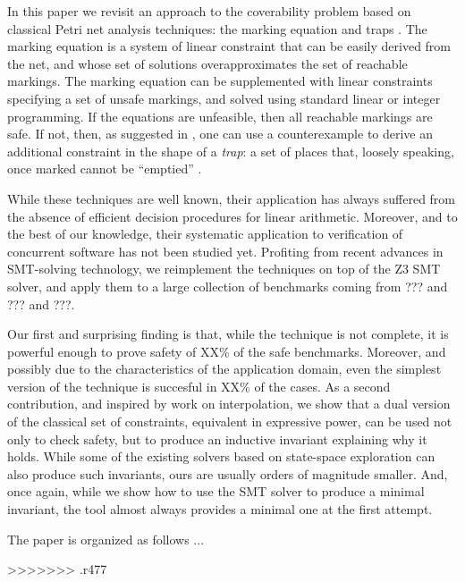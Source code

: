 In this paper we revisit an approach to the coverability problem 
based on classical Petri net analysis techniques: the marking equation
and traps \cite{murata,esparza_and_melzer}. The marking equation
is a system of linear constraint that can be easily derived from the net, and
whose set of solutions overapproximates the set of reachable markings. 
The marking equation can be supplemented with linear constraints specifying
a set of unsafe markings, and solved using standard linear or integer 
programming. If the equations are unfeasible, then all reachable markings
are safe. If not, then, as suggested in \cite{}, one can use a counterexample
to derive an additional constraint in the shape of a {\em trap}:  a set of
places that, loosely speaking, once marked cannot be ``emptied'' \cite{}.

While these techniques are well known, their application has always
suffered from the absence of efficient decision procedures for linear arithmetic.
Moreover, and to the best of our knowledge, their
systematic application to verification of concurrent software has not 
been studied yet. Profiting from recent advances in SMT-solving technology, 
we reimplement the techniques on top of
the Z3 SMT solver, and apply them to a large collection of benchmarks
coming from ??? and ??? and ???. 

Our first and surprising finding is that, 
while the technique is not complete, it is powerful enough to prove safety 
of XX\% of the safe benchmarks. Moreover, and possibly due to the characteristics
of the application domain, even the simplest version of the technique is
succesful in XX\% of the cases. As a second contribution, and inspired by work
on interpolation, we show that a dual version of the classical set 
of constraints, equivalent in expressive power, can be used not only
to check safety, but to produce an inductive invariant explaining why it holds. 
While some of the existing solvers based on state-space exploration can also
produce such invariants, ours are usually orders of magnitude smaller. 
And, once again, while we show how to use the SMT 
solver to produce a minimal invariant, the tool almost always provides a 
minimal one at the first attempt.

The paper is organized as follows ...



>>>>>>> .r477
